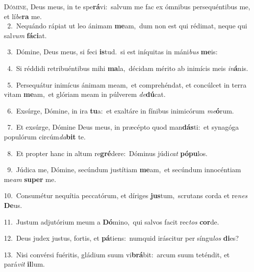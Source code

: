 \lettrine{\initial\textcolor{\initialcolor}{D}}{ómine,} Deus meus, in te spe\-\textbf{rá}\-vi:~\star salvum me fac ex ómnibus persequéntibus me, et lí\-\textit{be}\-\textbf{ra} me.\\
{\numbfont\textcolor{\numbcolor}{~2.}}~Nequándo rápiat ut leo ánimam \textbf{me}\-am,~\star dum non est qui rédimat, neque qui sal\textit{vum} \textbf{fá}\-\textbf{ci}at.\par
{\numbfont\textcolor{\numbcolor}{~3.}}~Dómine, Deus meus, si feci \textbf{is}\-tud.~\star si est iníquitas in máni\textit{bus} \textbf{me}\-is:\par
{\numbfont\textcolor{\numbcolor}{~4.}}~Si réddidi retribuéntibus mihi \textbf{ma}\-la,~\star décidam mérito ab inimícis meis \textit{in}\-\textbf{á}nis.\par
{\numbfont\textcolor{\numbcolor}{~5.}}~Persequátur inimícus ánimam meam,~\dagger et comprehéndat, et concúlcet in terra vitam \textbf{me}\-am,~\star et glóriam meam in púlverem \textit{de}\-\textbf{dú}cat.\par
{\numbfont\textcolor{\numbcolor}{~6.}}~Exsúrge, Dómine, in ira \textbf{tu}\-a:~\star et exaltáre in fínibus inimicórum \textit{me}\-\textbf{ó}rum.\par
{\numbfont\textcolor{\numbcolor}{~7.}}~Et exsúrge, Dómine Deus meus, in præcépto quod man\-\textbf{dás}\-ti:~\star et synagóga populórum circúm\-\textit{da}\-\textbf{bit} te.\par
{\numbfont\textcolor{\numbcolor}{~8.}}~Et propter hanc in altum re\-\textbf{gré}\-dere:~\star Dóminus júdi\textit{cat} \textbf{pó}\-\textbf{pu}los.\par
{\numbfont\textcolor{\numbcolor}{~9.}}~Júdica me, Dómine, secúndum justítiam \textbf{me}\-am,~\star et secúndum innocéntiam me\textit{am} \textbf{su}\-\textbf{per} me.\par
{\numbfont\textcolor{\numbcolor}{10.}}~Consumétur nequítia peccatórum, et díriges \textbf{jus}\-tum,~\star scrutans corda et re\textit{nes} \textbf{De}\-us.\par
{\numbfont\textcolor{\numbcolor}{11.}}~Justum adjutórium meum a \textbf{Dó}\-mino,~\star qui salvos facit rec\textit{tos} \textbf{cor}\-de.\par
{\numbfont\textcolor{\numbcolor}{12.}}~Deus judex justus, fortis, et \textbf{pá}\-tiens:~\star numquid iráscitur per síngu\textit{los} \textbf{di}\-es?\par
{\numbfont\textcolor{\numbcolor}{13.}}~Nisi convérsi fuéritis, gládium suum vi\-\textbf{brá}\-bit:~\star arcum suum teténdit, et pará\textit{vit} \textbf{il}\-lum.\par
